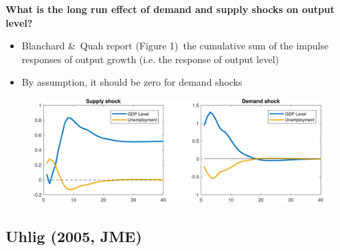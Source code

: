 \begin{frame}
{\textbf{What is the long run effect of demand and supply shocks on output
level?}}

\begin{itemize}
\item Blanchard \&\ Quah report (Figure 1)\ the cumulative sum of the
impulse responses of output growth (i.e. the response of output
level)\medskip

\item By assumption, it should be zero for demand shocks \  \vspace{%
-0.1cm}\pause
\end{itemize}

\begin{figure}[h]
\vspace{.3cm}\includegraphics[width=.8\textwidth]{BQ_Replication.pdf}
\end{figure}
\end{frame}


\subsection{Uhlig (2005, JME)}

\begin{frame}
\vspace{3cm} \color{title}%
\bigskip

\color{note}
\end{frame}



